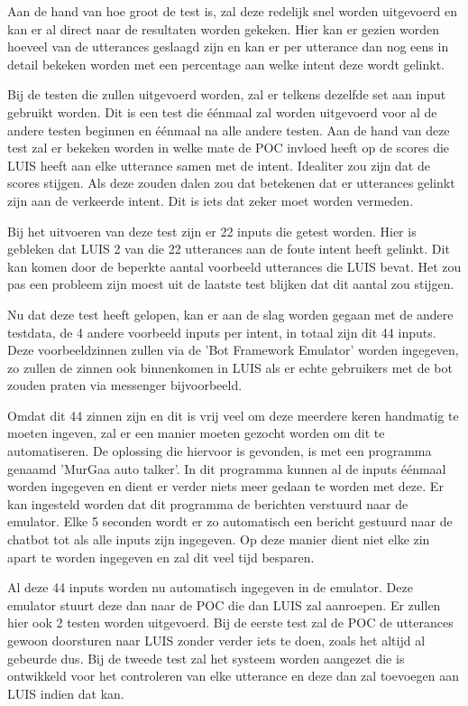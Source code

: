 Aan de hand van hoe groot de test is, zal deze redelijk snel worden uitgevoerd en kan er al direct naar de resultaten worden gekeken. Hier kan er gezien worden hoeveel van de utterances geslaagd zijn en kan er per utterance dan nog eens in detail bekeken worden met een percentage aan welke intent deze wordt gelinkt.

Bij de testen die zullen uitgevoerd worden, zal er telkens dezelfde set aan input gebruikt worden. Dit is een test die éénmaal zal worden uitgevoerd voor al de andere testen beginnen en éénmaal na alle andere testen. Aan de hand van deze test zal er bekeken worden in welke mate de POC invloed heeft op de scores die LUIS heeft aan elke utterance samen met de intent. Idealiter zou zijn dat de scores stijgen. Als deze zouden dalen zou dat betekenen dat er utterances gelinkt zijn aan de verkeerde intent. Dit is iets dat zeker moet worden vermeden.

Bij het uitvoeren van deze test zijn er 22 inputs die getest worden. Hier is gebleken dat LUIS 2 van die 22 utterances aan de foute intent heeft gelinkt. Dit kan komen door de beperkte aantal voorbeeld utterances die LUIS bevat. Het zou pas een probleem zijn moest uit de laatste test blijken dat dit aantal zou stijgen.

Nu dat deze test heeft gelopen, kan er aan de slag worden gegaan met de andere testdata, de 4 andere voorbeeld inputs per intent, in totaal zijn dit 44 inputs. Deze voorbeeldzinnen zullen via de 'Bot Framework Emulator' worden ingegeven, zo zullen de zinnen ook binnenkomen in LUIS als er echte gebruikers met de bot zouden praten via messenger bijvoorbeeld.

Omdat dit 44 zinnen zijn en dit is vrij veel om deze meerdere keren handmatig te moeten ingeven, zal er een manier moeten gezocht worden om dit te automatiseren. De oplossing die hiervoor is gevonden, is met een programma genaamd 'MurGaa auto talker'. In dit programma kunnen al de inputs éénmaal worden ingegeven en dient er verder niets meer gedaan te worden met deze. Er kan ingesteld worden dat dit programma de berichten verstuurd naar de emulator. Elke 5 seconden wordt er zo automatisch een bericht gestuurd naar de chatbot tot als alle inputs zijn ingegeven. Op deze manier dient niet elke zin apart te worden ingegeven en zal dit veel tijd besparen.

Al deze 44 inputs worden nu automatisch ingegeven in de emulator. Deze emulator stuurt deze dan naar de POC die dan LUIS zal aanroepen. Er zullen hier ook 2 testen worden uitgevoerd. Bij de eerste test zal de POC de utterances gewoon doorsturen naar LUIS zonder verder iets te doen, zoals het altijd al gebeurde dus. Bij de tweede test zal het systeem worden aangezet die is ontwikkeld voor het controleren van elke utterance en deze dan zal toevoegen aan LUIS indien dat kan.

